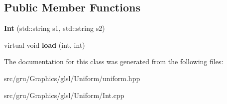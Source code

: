 \subsection*{\-Public \-Member \-Functions}
\begin{DoxyCompactItemize}
\item 
\hypertarget{classglutpp_1_1glsl_1_1Uniform_1_1Vector_1_1Int_a05216ab291a6466fd6404e8271b440e9}{{\bfseries \-Int} (std\-::string s1, std\-::string s2)}\label{classglutpp_1_1glsl_1_1Uniform_1_1Vector_1_1Int_a05216ab291a6466fd6404e8271b440e9}

\item 
\hypertarget{classglutpp_1_1glsl_1_1Uniform_1_1Vector_1_1Int_aced65097bbb181aaf0d8ebdbbf23dfba}{virtual void {\bfseries load} (int, int)}\label{classglutpp_1_1glsl_1_1Uniform_1_1Vector_1_1Int_aced65097bbb181aaf0d8ebdbbf23dfba}

\end{DoxyCompactItemize}


\-The documentation for this class was generated from the following files\-:\begin{DoxyCompactItemize}
\item 
src/gru/\-Graphics/glsl/\-Uniform/uniform.\-hpp\item 
src/gru/\-Graphics/glsl/\-Uniform/\-Int.\-cpp\end{DoxyCompactItemize}
